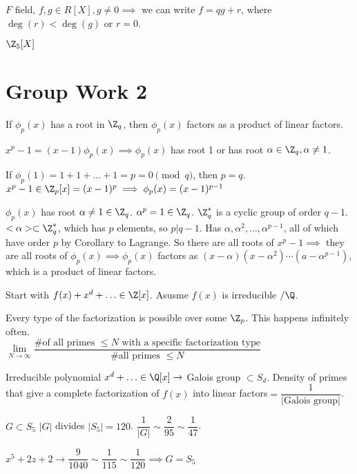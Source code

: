 \documentclass[10pt]{article}
\begin{document}
\begin{defn}
    $F$ field, $f, g\in R[X], g\neq 0 \implies$ we can write $f = qg + r$, where $\deg(r) < \deg(g)$ or $r = 0$.
\end{defn}

$\Z_5[X]$ 

\section{Group Work 2}
\begin{rmk}
    If $\phi_p(x)$ has a root in $\Z_q$, then $\phi_p(x)$ factors as a product of linear factors.
\end{rmk}

$x^p-1 = (x-1) \phi_p(x) \implies \phi_p(x)$ has root 1 or has root $\alpha \in \Z_q, \alpha\neq 1$.

If $\phi_p(1) = 1 + 1 + \ldots + 1 = p = 0 \pmod{q}$, then $p = q$. $x^p - 1 \in \Z_p[x] = (x-1)^p \implies \phi_p(x) = (x-1)^{p-1}$

$\phi_p(x)$ has root $\alpha \neq 1 \in \Z_q$. $\alpha^p = 1 \in \Z_q$. $\Z_q^*$ is a cyclic group of order $q-1$. $<\alpha> \subset \Z_q^*$, which has $p$ elements, so $p | q-1$. Has $\alpha, \alpha^2, \ldots, \alpha^{p-1}$, all of which have order $p$ by Corollary to Lagrange. So there are all roots of $x^p - 1 \implies$ they are all roots of $\phi_p(x) \implies \phi_p(x)$ factors as $(x-\alpha)(x-\alpha^2)\cdots (a-\alpha^{p-1})$, which is a product of linear factors.

Start with $f(x) + x^d + \ldots \in \Z[x]$. Asusme $f(x)$ is irreducible $/\Q$. 
\begin{thm*}
    Every type of the factorization is possible  over some $\Z_p$. This happens infinitely often.\\
    $\lim\limits_{N\to \infty}\dfrac{\text{\# of all primes }\leq N \text{ with a specific factorization type}}{\text{\# all primes }\leq N}$
\end{thm*}

Irreducible polynomial $x^d + \ldots \in \Q[x] \to $ Galois group $\subset S_d$. Density of primes that give a complete factorization of $f(x)$ into linear factors$ = \dfrac{1}{|\text{Galois group}|}$.

$G\subset S_5$ $|G|$ divides $|S_5| = 120$. $\dfrac{1}{|G|} \sim \dfrac{2}{95}\sim \dfrac{1}{47}$.

$x^5 + 2z + 2 \to \dfrac{9}{1040} \sim \dfrac{1}{115} \sim \dfrac{1}{120}\implies G = S_5$
\end{document}
